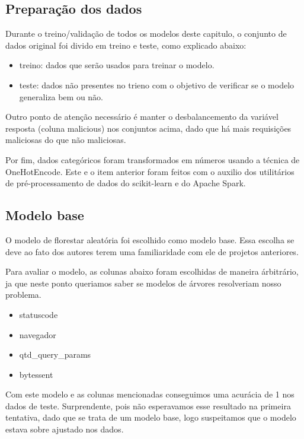 \subsection{Preparação dos dados}

Durante o treino/validação de todos os modelos deste capitulo, o conjunto de dados original foi divido 
em treino e teste, como explicado abaixo:

\begin{itemize}
    \item treino: dados que serão usados para treinar o modelo.
    \item teste: dados não presentes no trieno com o objetivo de verificar se o modelo generaliza bem ou não.
\end{itemize}

Outro ponto de atenção necessário é manter o desbalancemento da variável resposta (coluna malicious) nos 
conjuntos acima, dado que há mais requisições maliciosas do que não maliciosas. 

Por fim, dados categóricos foram transformados em números usando a técnica de OneHotEncode. Este e o item
anterior foram feitos com o auxilio dos utilitários de pré-processamento de dados do scikit-learn e do Apache Spark.

\subsection{Modelo base}

O modelo de florestar aleatória foi escolhido como modelo base. Essa escolha se deve ao fato dos autores 
terem uma familiaridade com ele de projetos anteriores. 

Para avaliar o modelo, as colunas abaixo foram escolhidas de maneira árbitrário, ja que neste ponto 
queriamos saber se modelos de árvores resolveriam nosso problema.

\begin{itemize}
    \item statuscode
    \item navegador
    \item qtd\_query\_params
    \item bytessent
\end{itemize}


Com este modelo e as colunas mencionadas conseguimos uma acurácia de 1 nos dados de teste. Surprendente, pois 
não esperavamos esse resultado na primeira tentativa, dado que se trata de um modelo base, logo suspeitamos 
que o modelo estava sobre ajustado nos dados. 

